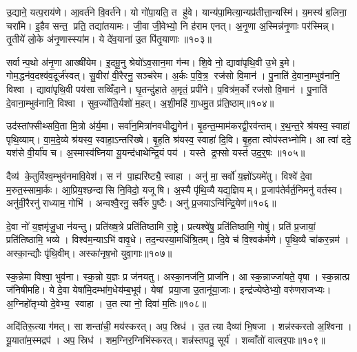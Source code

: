 उ॒द्याने॒ यत्प॒राय॑णे। आ॒वर्त॑ने वि॒वर्त॑ने। यो गो॑पा॒यति॒ त हु॑वे। यान्य॑पा॒मित्या॒न्यप्र॑तीत्ता॒न्यस्मि॑। य॒मस्य॑ ब॒लिना॒ चरा॑मि। इ॒हैव सन्त॒ प्रति॒ तद्या॑तयामः। जी॒वा जी॒वेभ्यो॒ नि ह॑राम एनत्। अ॒नृ॒णा अ॒स्मिन्न॑नृ॒णाः पर॑स्मिन्न्। तृ॒तीये॑ लो॒के अ॑नृ॒णास्स्या॑म। ये दे॑व॒याना॑ उ॒त पि॑तृ॒याणाः॥१०३॥

सर्वान्प॒थो अ॑नृ॒णा आख्षी॑येम। इ॒दमू॒नु श्रेयो॑ऽव॒सान॒मा ग॑न्म। शि॒वे नो॒ द्यावा॑पृथि॒वी उ॒भे इ॒मे। गोम॒द्धन॑व॒दश्व॑व॒दूर्ज॑स्वत्। सु॒वीरा॑ वी॒रैरनु॒ सञ्च॑रेम। अ॒र्कः प॒वि॒त्र॒ रज॑सो वि॒मान॑। पु॒नाति॑ दे॒वाना॒म्भुव॑नानि॒ विश्वा। द्यावा॑पृथि॒वी पय॑सा सव्विँदा॒ने। घृ॒तन्दु॑हाते अ॒मृतं॒ प्रपी॑ने। प॒वित्र॑म॒र्को रज॑सो वि॒मान॑। पु॒नाति॑ दे॒वाना॒म्भुव॑नानि॒ विश्वा। सुव॒र्ज्योति॒र्यशो॑ म॒हत्। अ॒शी॒महि॑ गा॒धमु॒त प्र॑ति॒ष्ठाम्॥१०४॥\anuvakamend[चा॒त॒य॒त॒ श्री॒णी॒ता॒ स॒त्यमा॒हुर॑शीमहि ग॒णे कु॑रु वि॒द्रव॑णे पितृ॒याणा॑ अ॒र्को रज॑सो वि॒मान॒स्त्रीणि॑ च]

उद॑स्तांफ्सीथ्सवि॒ता मि॒त्रो अ॑र्य॒मा। सर्वा॑न॒मित्रा॑नवधीद्यु॒गेन॑। बृ॒हन्त॒म्माम॑करद्वी॒रव॑न्तम्। र॒थ॒न्त॒रे श्र॑यस्व॒ स्वाहा॑ पृथि॒व्याम्। वा॒म॒दे॒व्ये श्र॑यस्व॒ स्वाहा॒ऽन्तरि॑ख्षे। बृ॒ह॒ति श्र॑यस्व॒ स्वाहा॑ दि॒वि। बृ॒ह॒ता त्वोप॑स्तभ्नोमि। आ त्वा॑ ददे॒ यश॑से वी॒र्या॑य च। अ॒स्मास्व॑घ्निया यू॒यन्द॑धाथेन्द्रि॒यं पय॑। यस्ते द्र॒फ्सो यस्त॑ उद॒र्॒षः ॥१०५॥

दैव्य॑ के॒तुर्विश्व॒म्भुव॑नमावि॒वेश॑। स न॑ पा॒ह्यरि॑ष्ट्यै॒ स्वाहा। अनु॑ मा॒ सर्वो॑ य॒ज्ञो॑ऽयमे॑तु। विश्वे॑ दे॒वा म॒रुत॒स्सामा॒र्कः। आ॒प्रिय॒श्छन्दासि नि॒विदो॒ यजूषि। अ॒स्यै पृ॑थि॒व्यै यद्य॒ज्ञियम्। प्र॒जाप॑तेर्वर्त॒निमनु॑ वर्तस्व। अनु॑वी॒रैरनु॑ राध्याम॒ गोभि॑। अन्वश्वै॒रनु॒ सर्वै॑रु पु॒ष्टैः। अनु॑ प्र॒जयाऽन्वि॑न्द्रि॒येण॑॥१०६॥

दे॒वा नो॑ य॒ज्ञमृ॑जु॒धा न॑यन्तु। प्रति॑ख्ष॒त्रे प्रति॑तिष्ठामि रा॒ष्ट्रे। प्रत्यश्वे॑षु॒ प्रति॑तिष्ठामि॒ गोषु॑। प्रति॑ प्र॒जायां॒ प्रति॑तिष्ठामि॒ भव्ये। विश्व॑म॒न्याऽभि॑ वावृ॒धे। तद॒न्यस्या॒मधि॑श्रि॒तम्। दि॒वे च॑ वि॒श्वक॑र्मणे। पृ॒थि॒व्यै चा॑कर॒न्नम॑। अस्का॒न्द्यौः पृ॑थि॒वीम्। अस्का॑नृष॒भो युवा॒गाः॥१०७॥

स्क॒न्नेमा विश्वा॒ भुव॑ना। स्क॒न्नो य॒ज्ञः प्र ज॑नयतु। अस्का॒नज॑नि॒ प्राज॑नि। आ स्क॒न्नाज्जा॑यते॒ वृषा। स्क॒न्नात्प्र ज॑निषीमहि। ये दे॒वा येषा॑मि॒दम्भा॑ग॒धेय॑म्ब॒भूव॑। येषां प्रया॒जा उ॒तानू॑या॒जाः। इन्द्र॑ज्येष्ठेभ्यो॒ वरु॑णराजभ्यः। अ॒ग्निहो॑तृभ्यो दे॒वेभ्य॒ स्वाहा। उ॒त त्या नो॒ दिवा॑ म॒तिः॥१०८॥

अदि॑तिरू॒त्या ग॑मत्। सा शन्ता॑ची॒ मय॑स्करत्। अप॒ स्रिध॑। उ॒त त्या दैव्या॑ भि॒षजा। शन्न॑स्करतो अ॒श्विना। यू॒याता॑म॒स्मद्रप॑। अप॒ स्रिध॑। शम॒ग्निर॒ग्निभि॑स्करत्। शन्न॑स्तपतु॒ सूर्य॑। शव्वाँतो॑ वात्वर॒पाः॥१०९॥


